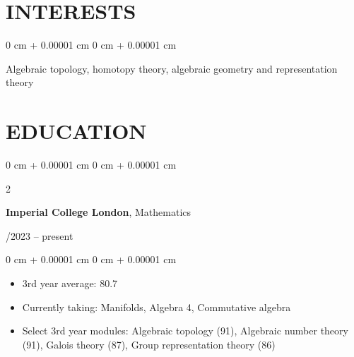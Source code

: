 \documentclass[10pt, letterpaper]{article}
\newenvironment{highlights}{
    \begin{itemize}[
        topsep=0.10 cm,
        parsep=0.10 cm,
        partopsep=0pt,
        itemsep=0pt,
        leftmargin=0 cm + 10pt
    ]
}{
    \end{itemize}
}
\newenvironment{onecolentry}{
    \begin{adjustwidth}{
        0 cm + 0.00001 cm
    }{
        0 cm + 0.00001 cm
    }
}{
    \end{adjustwidth}
}
\newenvironment{twocolentry}[2][]{
    \onecolentry
    \def\secondColumn{#2}
    \setcolumnwidth{\fill, 4.5 cm}
    \begin{paracol}{2}
}{
    \switchcolumn \raggedleft \secondColumn
    \end{paracol}
    \endonecolentry
} %
\begin{document}





    \section{INTERESTS}
    
        \begin{onecolentry}
            Algebraic topology, homotopy theory, algebraic geometry and representation theory
        \end{onecolentry}

        \vspace{0.2 cm}

    \section{EDUCATION}



        
        \begin{twocolentry}{
            10/2023 – present
        }
            \textbf{Imperial College London}, Mathematics
        \end{twocolentry}

        \vspace{0.10 cm}
        \begin{onecolentry}
            \begin{highlights}
                \item 3rd year average: 80.7
                \item Currently taking: Manifolds, Algebra 4, Commutative algebra
                \item Select 3rd year modules: Algebraic topology (91), Algebraic number theory (91), Galois theory (87), Group representation theory (86)
            \end{highlights}
        \end{onecolentry}
\end{document}
